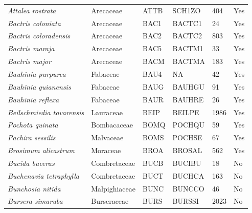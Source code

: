 \documentclass[11pt]{article}
\begin{document}
\begin{longtable}{@{}llllll@{}}
\textit{Attalea rostrata}                             & Arecaceae        & ATTB   & SCH1ZO & 404             & Yes       \\
\textit{Bactris coloniata}                            & Arecaceae        & BAC1   & BACTC1 & 24              & Yes       \\
\textit{Bactris coloradensis}                         & Arecaceae        & BAC2   & BACTC2 & 803             & Yes       \\
\textit{Bactris maraja}                               & Arecaceae        & BAC5   & BACTM1 & 33              & Yes       \\
\textit{Bactris major}                                & Arecaceae        & BACM   & BACTMA & 183             & Yes       \\
\textit{Bauhinia purpurea}                            & Fabaceae         & BAU4   & NA     & 42              & Yes       \\
\textit{Bauhinia guianensis}                          & Fabaceae         & BAUG   & BAUHGU & 91              & Yes       \\
\textit{Bauhinia reflexa}                             & Fabaceae         & BAUR   & BAUHRE & 26              & Yes       \\
\textit{Beilschmiedia tovarensis}                     & Lauraceae        & BEIP   & BEILPE & 1986            & Yes       \\
\textit{Pochota quinata}                              & Bombacaceae      & BOMQ   & POCHQU & 59              & Yes       \\
\textit{Pachira sessilis}                             & Malvaceae        & BOMS   & POCHSE & 67              & Yes       \\
\textit{Brosimum alicastrum}                          & Moraceae         & BROA   & BROSAL & 562             & Yes       \\
\textit{Bucida buceras}                               & Combretaceae     & BUCB   & BUCIBU & 18              & No        \\
\textit{Buchenavia tetraphylla}                       & Combretaceae     & BUCT   & BUCHCA & 163             & No        \\
\textit{Bunchosia nitida}                             & Malpighiaceae    & BUNC   & BUNCCO & 46              & No        \\
\textit{Bursera simaruba}                             & Burseraceae      & BURS   & BURSSI & 2023            & No        \\

\end{longtable}
\end{document}

